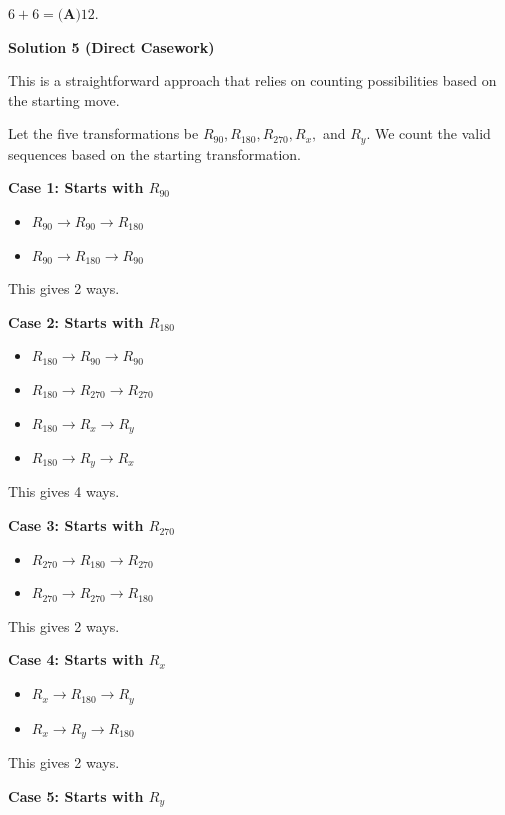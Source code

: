 \begin{enumerate}
 $6+6=\boxed{\textbf{(A)}  12}$.

 



\textbf{Solution 5 (Direct Casework)}

This is a straightforward approach that relies on counting possibilities based on the starting move.

 Let the five transformations be $R_{90}, R_{180}, R_{270}, R_x,$ and $R_y$. We count the valid sequences based on the starting transformation.

 \textbf{Case 1: Starts with $R_{90}$}

 
            \begin{itemize}
        \item $R_{90} \to R_{90} \to R_{180}$
        \item $R_{90} \to R_{180} \to R_{90}$
            \end{itemize}
            This gives 2 ways.

 \textbf{Case 2: Starts with $R_{180}$}

 
            \begin{itemize}
        \item $R_{180} \to R_{90} \to R_{90}$
        \item $R_{180} \to R_{270} \to R_{270}$
        \item $R_{180} \to R_x \to R_y$
        \item $R_{180} \to R_y \to R_x$
            \end{itemize}
            This gives 4 ways.

 \textbf{Case 3: Starts with $R_{270}$}

 
            \begin{itemize}
        \item $R_{270} \to R_{180} \to R_{270}$
        \item $R_{270} \to R_{270} \to R_{180}$
            \end{itemize}
            This gives 2 ways.

 \textbf{Case 4: Starts with $R_x$}

 
            \begin{itemize}
        \item $R_x \to R_{180} \to R_y$
        \item $R_x \to R_y \to R_{180}$
            \end{itemize}
            This gives 2 ways.

 \textbf{Case 5: Starts with $R_y$}


\end{enumerate}
